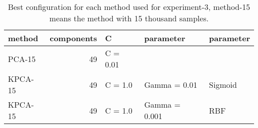 \begin{table}
    \centering
    \begin{tabular}{lrlll}
        \toprule
        method & components & C & parameter & parameter\\
        \midrule
        PCA-15 & 49 & C = 0.01 &  \\
        KPCA-15 & 49 & C = 1.0 & Gamma = 0.01 & Sigmoid \\
        KPCA-15 & 49 & C = 1.0 & Gamma = 0.001 & RBF \\
        \bottomrule
    \end{tabular}
    \caption{Best configuration for each method used for experiment-3, method-15 means the method with 15 thousand samples.}
    \label{tab:best-configuration-expr-3}
\end{table}